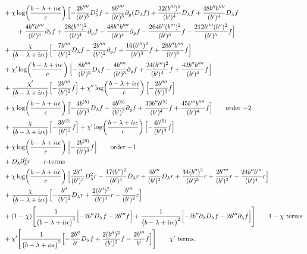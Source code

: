 \documentclass[reqno,11pt]{amsart}
\numberwithin{equation}{section}
\newcommand{\p}{\partial}
\newcommand{\D}{D_\lambda}
\numberwithin{equation}{section} %
\begin{document}
\begin{enumerate}
\begin{align}
&+\chi\log\!\left(\frac{b -\lambda+i\iota\epsilon}{c}\right)\Bigl[- \frac{2 b'''' }{(b' )^{3}} \D^2 f- \frac{8 b'''' }{(b' )^{3}} \p_y(\D f)+\frac{32 (b''' )^{2}}{(b' )^{4}} \D f+\frac{48 b''  b'''' }{(b' )^{4}} \D f\notag\\
&\qquad +\frac{4 b''  b'''' }{(b' )^{3}} \p_\lambda f+\frac{28 (b''' )^{2}}{(b' )^{4}} \p_y f+\frac{48 b''  b'''' }{(b' )^{4}} \p_y f- \frac{264 b''  (b''' )^{2}}{(b' )^{5}} f- \frac{212 b''''  (b'' )^{2}}{(b' )^{5}} f\Bigr]\notag\\
&+\frac{\chi}{\bigl(b -\lambda+i\iota\epsilon\bigr)}\Bigl[- \frac{7 b'''' }{(b' )^{2}} \D f- \frac{2 b'''' }{(b' )^{2}} \p_y f+\frac{16 (b''' )^{2}}{(b' )^{3}} f+\frac{28 b''  b'''' }{(b' )^{3}} f\Bigr]\notag\\
&+\chi'\log\!\left(\frac{b -\lambda+i\iota\epsilon}{c}\right)\Bigl[- \frac{8 b'''' }{(b' )^{3}} \D f- \frac{4 b'''' }{(b' )^{3}} \p_y f+\frac{24 (b''' )^{2}}{(b' )^{4}} f+\frac{42 b''  b'''' }{(b' )^{4}} f\Bigr]\notag\\
&+\frac{\chi'}{\bigl(b -\lambda+i\iota\epsilon\bigr)}\Bigl[- \frac{2 b'''' }{(b' )^{2}} f\Bigr]+\chi''\log\!\left(\frac{b -\lambda+i\iota\epsilon}{c}\right)\Bigl[- \frac{2 b'''' }{(b' )^{3}} f\Bigr]\notag\\
&+\chi\log\!\left(\frac{b -\lambda+i\iota\epsilon}{c}\right)\Bigl[- \frac{4 b^{(5)} }{(b' )^{3}} \D f- \frac{4 b^{(5)} }{(b' )^{3}} \p_y f+\frac{30 b''  b^{(5)} }{(b' )^{4}} f+\frac{45 b'''  b'''' }{(b' )^{4}} f\Bigr]\tag*{\text{order $-2$}}\\
&+\frac{\chi}{\bigl(b -\lambda+i\iota\epsilon\bigr)}\Bigl[- \frac{3 b^{(5)} }{(b' )^{2}} f\Bigr]+\chi'\log\!\left(\frac{b -\lambda+i\iota\epsilon}{c}\right)\Bigl[- \frac{4 b^{(5)} }{(b' )^{3}} f\Bigr]\notag\\
&+\chi\log\!\left(\frac{b -\lambda+i\iota\epsilon}{c}\right)\Bigl[- \frac{2 b^{(6)} }{(b' )^{3}} f\Bigr]\tag*{\text{order $-1$}}\\
&+\D\p_\lambda^2 r\tag*{\text{$r$-terms}}\\
&+\chi\log\!\left(\frac{b -\lambda+i\iota\epsilon}{c}\right)\Bigl[\frac{2 b'' }{(b' )^{3}} \D^2 r- \frac{17 (b'' )^{2}}{(b' )^{4}} \D r+\frac{4 b''' }{(b' )^{3}} \D r+\frac{34 (b'' )^{3}}{(b' )^{5}} r+\frac{2 b'''' }{(b' )^{3}} r- \frac{24 b''  b''' }{(b' )^{4}} r\Bigr]\notag\\
&+\frac{\chi}{\bigl(b -\lambda+i\iota\epsilon\bigr)}\Bigl[- \frac{b'' }{(b' )^{2}} \D r+\frac{2 (b'' )^{2}}{(b' )^{3}} r- \frac{b''' }{(b' )^{2}} r\Bigr]\notag\\
&+(1-\chi)\Bigg[\frac{1}{\bigl(b -\lambda+i\iota\epsilon\bigr)^{3}}\Bigl[- 2 b''  \D f- 2 b'''  f\Bigr]+\frac{1}{\bigl(b -\lambda+i\iota\epsilon\bigr)^{2}}\Bigl[- 2 b''  \p_\lambda\D f- 2 b'''  \p_\lambda f\Bigr]\Bigg]\tag*{\text{$1-\chi$ terms}}\\
&+\chi'\Bigg[\frac{1}{\bigl(b -\lambda+i\iota\epsilon\bigr)^{2}}\Bigl[- \frac{2 b'' }{b' } \D f+\frac{2 (b'' )^{2}}{(b' )^{2}} f- \frac{2 b''' }{b' } f\Bigr]\Bigg]\tag*{\text{$\chi'$ terms}}.\\
&
\end{align}


\end{enumerate}
\end{document}
